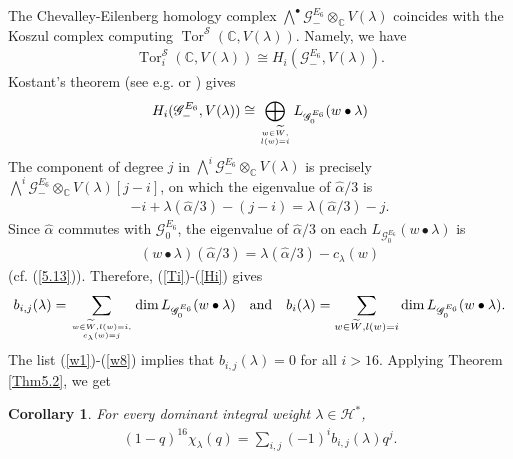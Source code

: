 \documentclass[12pt]{article}
\numberwithin{equation}{section}
\newtheorem{corollary}[theorem]{Corollary}
\theoremstyle{definition}
\theoremstyle{remark}
\begin{document}
The Chevalley-Eilenberg homology complex $\bigwedge^{\bullet}\mathscr{G}^{E_6}_-\otimes_{\mathbb{C}}V(\lambda)$
coincides with the Koszul complex computing $\operatorname{Tor}^{\mathscr{S}}(\mathbb{C},V(\lambda))$. Namely, we have
\begin{eqnarray}
	\operatorname{Tor}_i^{\mathscr{S}}(\mathbb{C},V(\lambda))\cong H_i(\mathscr{G}^{E_6}_-,V(\lambda)). \label{Ti}
\end{eqnarray}
Kostant's theorem (see e.g. \cite[Theorem 5.14]{K} or \cite[Theorem 5.1]{SVW}) gives
\begin{eqnarray}
	H_i(\mathscr{G}^{E_6}_-,V(\lambda))\cong\bigoplus_{w\in\widetilde{W},\atop l(w)=i} L_{\mathscr{G}^{E_6}_0}(w\bullet\lambda) \label{Hi} 
\end{eqnarray}
The component of degree $j$ in $\bigwedge^{i}\mathscr{G}^{E_6}_-\otimes_{\mathbb{C}}V(\lambda)$ is precisely $\bigwedge^{i}\mathscr{G}^{E_6}_-\otimes_{\mathbb{C}}V(\lambda)[j-i]$, on which the eigenvalue of $\widehat{\alpha}/3$ is
\begin{eqnarray}
	-i+\lambda(\widehat{\alpha}/3)-(j-i)=\lambda(\widehat{\alpha}/3)-j.
\end{eqnarray}
Since $\widehat{\alpha}$ commutes with $\mathscr{G}^{E_6}_0$, the eigenvalue of $\widehat{\alpha}/3$ on each $L_{\mathscr{G}^{E_6}_0}(w\bullet\lambda)$ is
\begin{eqnarray}
	(w\bullet\lambda)(\widehat{\alpha}/3)=\lambda(\widehat{\alpha}/3)-c_{\lambda}(w)
\end{eqnarray}
(cf. (\ref{5.13})). Therefore, (\ref{Ti})-(\ref{Hi}) gives 
\begin{eqnarray}
	b_{i,j}(\lambda)=\sum\limits_{w\in\widetilde{W},l(w)=i,\atop c_{\lambda}(w)=j}\dim L_{\mathscr{G}^{E_6}_0}(w\bullet\lambda)\quad\text{and}\quad b_{i}(\lambda)=\sum\limits_{w\in\widetilde{W},l(w)=i}\dim L_{\mathscr{G}^{E_6}_0}(w\bullet\lambda). \label{bij}
\end{eqnarray}
The list (\ref{w1})-(\ref{w8}) implies that $b_{i,j}(\lambda)=0$ for all $i>16$. Applying Theorem \ref{Thm5.2}, we get
\begin{corollary}
	For every dominant integral weight $\lambda\in \mathscr{H}^*$,
	\begin{eqnarray}
		(1-q)^{16}\chi_{\lambda}(q)=\sum_{i,j}(-1)^{i}b_{i,j}(\lambda)q^{j}.\label{5.38}
	\end{eqnarray}
\end{corollary}
\end{document}
